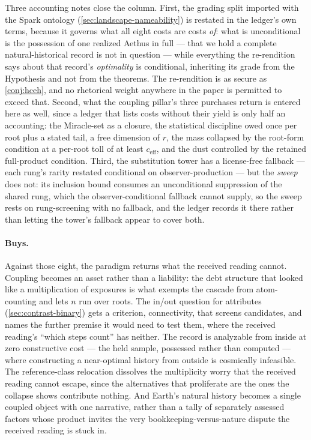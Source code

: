 \documentclass[11pt]{article}
\theoremstyle{definition}
\begin{document}
Three accounting notes close the column. First, the grading split imported with the Spark ontology (\autoref{sec:landscape-nameability}) is restated in the ledger's own terms, because it governs what all eight costs are costs \emph{of}: what is unconditional is the possession of one realized Aethus in full --- that we hold a complete natural-historical record is not in question --- while everything the re-rendition says about that record's \emph{optimality} is conditional, inheriting its grade from the Hypothesis and not from the theorems. The re-rendition is as secure as \autoref{conj:hceh}, and no rhetorical weight anywhere in the paper is permitted to exceed that. Second, what the coupling pillar's three purchases return is entered here as well, since a ledger that lists costs without their yield is only half an accounting: the Miracle-set as a closure, the statistical discipline owed once per root plus a stated tail, a free dimension of $r$, the mass collapsed by the root-form condition at a per-root toll of at least $c_{\mathrm{eff}}$, and the dust controlled by the retained full-product condition. Third, the substitution tower has a license-free fallback --- each rung's rarity restated conditional on observer-production --- but the \emph{sweep} does not: its inclusion bound consumes an unconditional suppression of the shared rung, which the observer-conditional fallback cannot supply, so the sweep rests on rung-screening with no fallback, and the ledger records it there rather than letting the tower's fallback appear to cover both.

\paragraph{Buys.} Against those eight, the paradigm returns what the received reading cannot. Coupling becomes an asset rather than a liability: the debt structure that looked like a multiplication of exposures is what exempts the cascade from atom-counting and lets $n$ run over roots. The in/out question for attributes (\autoref{sec:contrast-binary}) gets a criterion, connectivity, that screens candidates, and names the further premise it would need to test them, where the received reading's ``which steps count'' has neither. The record is analyzable from inside at zero constructive cost --- the held sample, possessed rather than computed --- where constructing a near-optimal history from outside is cosmically infeasible. The reference-class relocation dissolves the multiplicity worry that the received reading cannot escape, since the alternatives that proliferate are the ones the collapse shows contribute nothing. And Earth's natural history becomes a single coupled object with one narrative, rather than a tally of separately assessed factors whose product invites the very bookkeeping-versus-nature dispute the received reading is stuck in.
\end{document}
